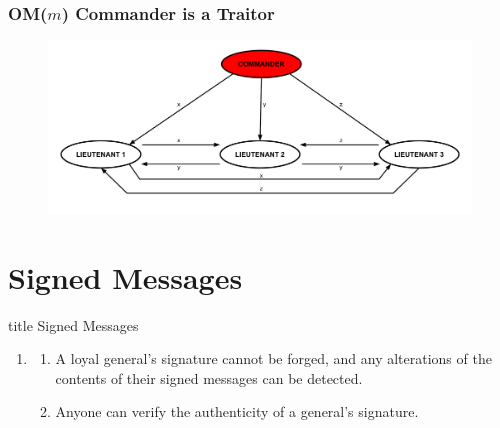 \documentclass{beamer}
\theoremstyle{conjecture1}
\theoremstyle{conjecture2}
\begin{document}
\begin{frame}
    \frametitle{OM($m$) Commander is a Traitor}
    \begin{figure}
        \centering
        \includegraphics[scale=.32]{../figures/oral_messages_OM(1)_unloyal_commander.pdf}
    \end{figure}
\end{frame}



\section{Signed Messages}

\begin{frame}[t]
    \vfill
    \centering
    \begin{beamercolorbox}[sep=8pt,center,shadow=true,rounded=true]{title}
        Signed Messages\par%
    \end{beamercolorbox}
\end{frame}

\begin{frame}
    \begin{enumerate}[label={A4.}]
        \item {
            \begin{enumerate}[label={(\alph*)}]
                \item<1-> {
                    A loyal general's signature cannot be forged, and any alterations of the contents of
                    their signed messages can be detected.
                }
                \item<2-> Anyone can verify the authenticity of a general's signature.
            \end{enumerate}
        }
    \end{enumerate}
\end{frame}
\end{document}
